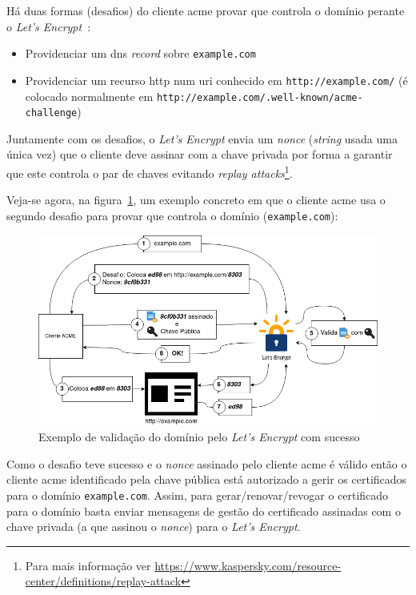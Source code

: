 Há duas formas (desafios) do cliente \acrshort{acme} provar que controla o domínio perante o \textit{Let's Encrypt}~\cite{domainValidation}:
\begin{itemize}
    \item Providenciar um \acrshort{dns} \textit{record} sobre \texttt{example.com}
    \item Providenciar um recurso \acrshort{http} num \acrshort{uri} conhecido em \texttt{http://example.com/} (é colocado normalmente em \texttt{http://example.com/.well-known/acme-challenge})
\end{itemize}

Juntamente com os desafios, o \textit{Let's Encrypt} envia um \textit{nonce} (\textit{string} usada uma única vez) que o cliente deve assinar com a chave privada por forma a garantir que este controla o par de chaves evitando \textit{replay attacks}\footnote{Para mais informação ver \url{https://www.kaspersky.com/resource-center/definitions/replay-attack}}.

Veja-se agora, na figura~\ref{fig:domainValidation}, um exemplo concreto em que o cliente \acrshort{acme} usa o segundo desafio para provar que controla o domínio (\texttt{example.com}):

\begin{figure}[H]
    \centering
    \includegraphics[width=1\textwidth]{img/domainValidation.png}
    \caption{Exemplo de validação do domínio pelo \textit{Let's Encrypt} com sucesso\label{fig:domainValidation}}
\end{figure}

Como o desafio teve sucesso e o \textit{nonce} assinado pelo cliente \acrshort{acme} é válido então o cliente \acrshort{acme} identificado pela chave pública está autorizado a gerir os certificados para o domínio \texttt{example.com}. Assim, para gerar/renovar/revogar o certificado para o domínio basta enviar mensagens de gestão do certificado assinadas com o chave privada (a que assinou o \textit{nonce}) para o \textit{Let's Encrypt}.

